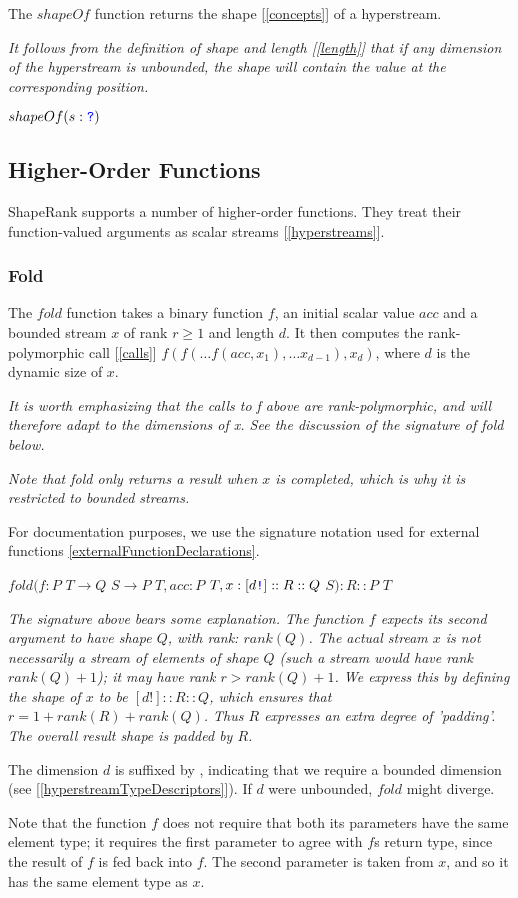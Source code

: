 \documentclass{article}
\begin{document}
The $shapeOf$ function returns the shape [\ref{concepts}] of a hyperstream.

{\em 
It follows from the  definition of shape and length [\ref{length}] that
if any  dimension of the hyperstream is unbounded, the shape will contain the value \QUESTIONMARK{} at the corresponding  position.
}

$shapeOf(s: \texttt{\color{blue} ?}{})$

\subsection{Higher-Order Functions}
\label{higherOrderFunctions}

ShapeRank supports a number of higher-order functions. They treat their function-valued arguments as scalar streams [\ref{hyperstreams}]. 


\subsubsection{Fold}
\label{fold}


The $fold$ function takes a binary function $f$, an initial scalar value $acc$ and a bounded stream $x$ of rank $r \ge 1$ and length $d$. It then computes the rank-polymorphic call [\ref{calls}]
$f(f( \ldots f(acc, x_1), \ldots x_{d-1}), x_d)$, where $d$ is the dynamic size of $x$.

{\em It is worth emphasizing that the calls to f above are rank-polymorphic, and will therefore adapt to the dimensions of x. See the discussion of the signature of fold below.
}

{\em Note that fold only returns a result when $x$ is completed, which is why it is restricted to bounded streams.}

For documentation purposes, we use the signature notation used for external functions \ref{externalFunctionDeclarations}.

$fold(f: P$ $T \to{}Q$ $S \to{}P$ $T, acc: P$ $T, x:[d\texttt{\color{blue} !}]::R::Q $ $S): R::P $ $T $

{\em
The signature above bears some explanation. The function $f$ expects its second argument to have shape $Q$, with rank: $rank(Q)$. The actual stream $x$ is not necessarily a stream of elements of shape $Q$ (such a stream would have rank $rank(Q) +1$); it may have rank $r \gt rank(Q) + 1$. We express this by defining the shape of $x$ to be $[d!]::R::Q$, which ensures that $r = 1 + rank(R) + rank(Q)$. Thus $R$ expresses an extra degree of 'padding'. The overall result shape is padded by $R$.

The dimension $d$ is suffixed by \BANG{}, indicating that we require a bounded dimension (see [\ref{hyperstreamTypeDescriptors}]). If $d$ were unbounded, $fold$ might diverge.

Note that the function $f$ does not require that both its parameters have the same element type; it requires the first parameter to agree with $f$s return type, since the result of $f$ is fed back  into $f$. The second parameter is taken from $x$, and so it has the same element type as $x$. 
}
\end{document}
